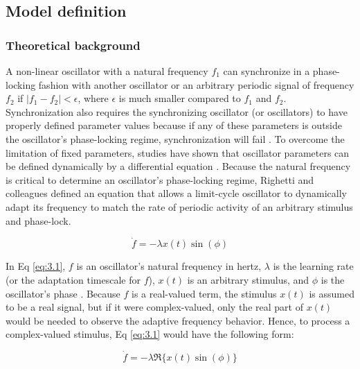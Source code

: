 \documentclass{report}
\begin{document}
\subsection{Model definition}

\subsubsection{Theoretical background}

A non-linear oscillator with a natural frequency $f_1$ can synchronize in a phase-locking fashion with another oscillator or an arbitrary periodic signal of frequency $f_2$ if $|f_1 − f_2| < \epsilon$, where $\epsilon$ is much smaller compared to $f_1$ and $f_2$. Synchronization also requires the synchronizing oscillator (or oscillators) to have properly defined parameter values because if any of these parameters is outside the oscillator's phase-locking regime, synchronization will fail \cite{righetti2006dynamic}. To overcome the limitation of fixed parameters, studies have shown that oscillator parameters can be defined dynamically by a differential equation \cite{acebron1998adaptive, borisyuk2001oscillatory, ermentrout1991adaptive, nakanishi2003learning, nishii1999learning, righetti2006dynamic}. Because the natural frequency is critical to determine an oscillator's phase-locking regime, Righetti and colleagues \cite{righetti2006dynamic} defined an equation that allows a limit-cycle oscillator to dynamically adapt its frequency to match the rate of periodic activity of an arbitrary stimulus and phase-lock.

\begin{equation}
\dot{f} = -\lambda x(t) \sin(\phi) \label{eq:3.1}
\end{equation}

In Eq \eqref{eq:3.1}, $f$ is an oscillator's natural frequency in hertz, $\lambda$ is the learning rate (or the adaptation timescale for $f$), $x(t)$ is an arbitrary stimulus, and $\phi$ is the oscillator's phase \cite{righetti2006dynamic}. Because $f$ is a real-valued term, the stimulus $x(t)$ is assumed to be a real signal, but if it were complex-valued, only the real part of $x(t)$ would be needed to observe the adaptive frequency behavior. Hence, to process a complex-valued stimulus, Eq \eqref{eq:3.1} would have the following form:

\begin{equation}
\dot{f} = -\lambda \Re \{ x(t) \sin(\phi) \} \label{eq:3.2}
\end{equation}
\end{document}
